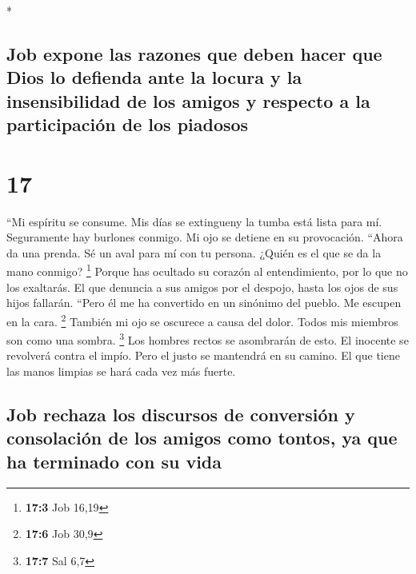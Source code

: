 \begin{paracol}{2}
\begin{otherlanguage}{english}
\end{otherlanguage}

\switchcolumn[0]*

\hypertarget{job-expone-las-razones-que-deben-hacer-que-dios-lo-defienda-ante-la-locura-y-la-insensibilidad-de-los-amigos-y-respecto-a-la-participaciuxf3n-de-los-piadosos}{%
\subsection{Job expone las razones que deben hacer que Dios lo defienda
ante la locura y la insensibilidad de los amigos y respecto a la
participación de los
piadosos}\label{job-expone-las-razones-que-deben-hacer-que-dios-lo-defienda-ante-la-locura-y-la-insensibilidad-de-los-amigos-y-respecto-a-la-participaciuxf3n-de-los-piadosos}}

\hypertarget{section-32}{%
\section{17}\label{section-32}}

 ``Mi espíritu se consume. Mis días se extingueny la tumba
está lista para mí.  Seguramente hay burlones conmigo. Mi
ojo se detiene en su provocación.  ``Ahora da una prenda.
Sé un aval para mí con tu persona. ¿Quién es el que se da la mano
conmigo? \footnote{\textbf{17:3} Job 16,19}  Porque has
ocultado su corazón al entendimiento, por lo que no los exaltarás.
 El que denuncia a sus amigos por el despojo, hasta los
ojos de sus hijos fallarán.  ``Pero él me ha convertido en
un sinónimo del pueblo. Me escupen en la cara. \footnote{\textbf{17:6}
  Job 30,9}  También mi ojo se oscurece a causa del dolor.
Todos mis miembros son como una sombra. \footnote{\textbf{17:7} Sal 6,7}
 Los hombres rectos se asombrarán de esto. El inocente se
revolverá contra el impío.  Pero el justo se mantendrá en
su camino. El que tiene las manos limpias se hará cada vez más fuerte.

\hypertarget{job-rechaza-los-discursos-de-conversiuxf3n-y-consolaciuxf3n-de-los-amigos-como-tontos-ya-que-ha-terminado-con-su-vida}{%
\subsection{Job rechaza los discursos de conversión y consolación de los
amigos como tontos, ya que ha terminado con su
vida}\label{job-rechaza-los-discursos-de-conversiuxf3n-y-consolaciuxf3n-de-los-amigos-como-tontos-ya-que-ha-terminado-con-su-vida}}


\end{paracol}
